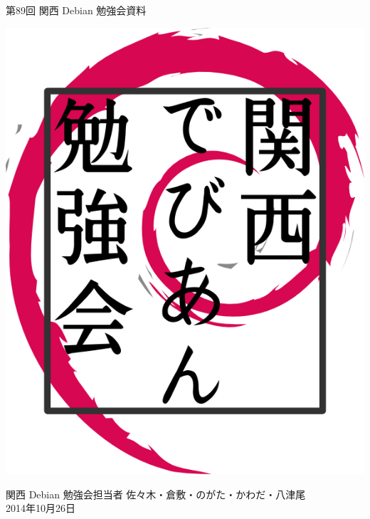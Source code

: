 \documentclass[mingoth,a4paper]{jsarticle}
\newcommand{\debmtgyear}{2014}
\newcommand{\debmtgdate}{26}
\newcommand{\debmtgmonth}{10}
\newcommand{\debmtgnumber}{89}
\begin{document}
\begin{titlepage}


 第\debmtgnumber{}回 関西 Debian 勉強会資料

\vspace{2cm}

\begin{center}
\includegraphics{image200802/kansaidebianlogo.png}
\end{center}

\begin{flushright}
\hfill{}関西 Debian 勉強会担当者 佐々木・倉敷・のがた・かわだ・八津尾 \\
\hfill{}\debmtgyear{}年\debmtgmonth{}月\debmtgdate{}日
\end{flushright}

\thispagestyle{empty}
\end{titlepage}


\vspace{1em}
\end{document}
